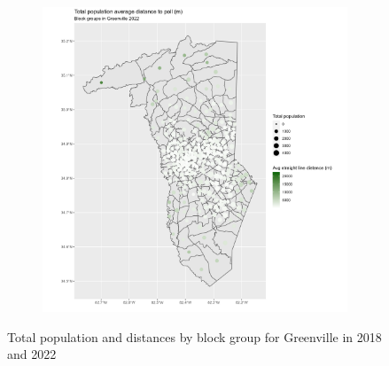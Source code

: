 \documentclass[11pt]{article}
\theoremstyle{remark}
\theoremstyle{definition}
\begin{document}
\begin{figure}
\begin{subfigure}{.5\textwidth}
		\includegraphics[width=\linewidth]{result_analysis/Greenville_County_SC_original_configs/population_pop_and_dist_Greenville_config_original_2022_polls.png}
		\label{sfig:Greenville_2022_bg_dist}
	\end{subfigure}
	\caption{Total population and distances by block group for Greenville in 2018 and 2022}
	\label{fig:Greenville distance Total population maps}
\end{figure}
\end{document}
